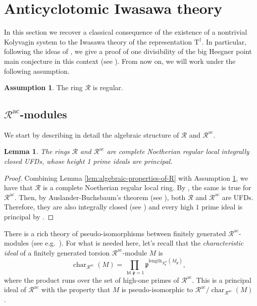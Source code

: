 \documentclass[12pt,reqno]{amsart}
\newtheorem{lemma}[theorem]{Lemma}
\theoremstyle{definition}
\newtheorem{assumption}[theorem]{Assumption}
\theoremstyle{remark}
\newcommand{\T}{\boldsymbol{\mathrm{T}}}
\newcommand{\calR}{\mathcal{R}}
\DeclareMathOperator{\Char}{char}
\DeclareMathOperator{\hight}{\mathrm{ht}}
\newcommand{\ac}{\mathrm{ac}}
\newcommand{\length}{\mathrm{length}}
\newcommand{\p}{\mathfrak{p}}
\begin{document}
\section{Anticyclotomic Iwasawa theory}\label{sec:Anticyclotomic-Iwasawa-theory}

In this section we recover a classical consequence of the existence of a nontrivial Kolyvagin system to the Iwasawa theory of the representation $\T^\dag$. In particular, following the ideas of \cite{Fouquet13:Dihedral}, we give a proof of one divisibility of the big Heegner point main conjecture in this context (see \cite[Conjecture 10.8]{Longo-Vigni11:quaternion-algebras-Hida-families}). From now on, we will work under the following assumption.

\begin{assumption}\label{ass:R-regular}
    The ring $\calR$ is regular.
\end{assumption}

\subsection{$\calR^\ac$-modules} 

We start by describing in detail the algebraic structure of $\calR$ and $\calR^{\ac}$.

\begin{lemma}\label{lem:regularity}
    The rings $\calR$ and $\calR^\ac$ are complete Noetherian regular local integrally closed UFDs, whose height 1 prime ideals are principal.
\end{lemma}
\begin{proof}
    Combining Lemma \ref{lem:algebraic-properties-of-R} with Assumption \ref{ass:R-regular}, we have that $\mathcal{R}$ is a complete Noetherian regular local ring. By \cite[Theorem 3.3, Exercise 8.6, Theorem 19.5]{Matsumura89:Commutative-ring-theory}, the same is true for $\calR^\ac$. Then, by Auslander-Buchsbaum's theorem (see \cite[Theorem 20.3]{Matsumura89:Commutative-ring-theory}), both $\mathcal{R}$ and $\mathcal{R}^{\ac}$ are UFDs. Therefore, they are also integrally closed (see \cite[Example 9.1]{Matsumura89:Commutative-ring-theory}) and every high $1$ prime ideal is principal by \cite[Theorem 20.1]{Matsumura89:Commutative-ring-theory}.
\end{proof}

There is a rich theory of pseudo-isomorphisms between finitely generated  $\calR^\ac$-modules (see e.g.~\cite[§VII.4.4]{Bourbaki98:commutative-algebra}). For what is needed here, let's recall that the \emph{characteristic ideal} of a finitely generated torsion $\calR^\ac$-module $M$ is
\begin{equation*}
         \Char_{\calR^{\ac}}(M)=\prod_{\hight\p=1} \p^{\length_{\calR^\ac_\p}(M_\p)},
\end{equation*}
where the product runs over the set of high-one primes of $\calR^\ac$. This is a principal ideal of $\calR^\ac$ with the property that $M$ is pseudo-isomorphic to $\calR^\ac/\Char_{\calR^{\ac}}(M)$.
\end{document}

